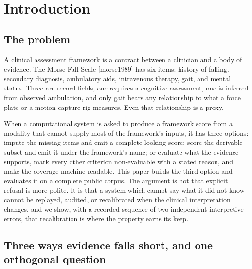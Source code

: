 \documentclass[11pt]{article}
\begin{document}
\begin{abstract}
evidence machinery, had Morse's category names baked in. The contribution is a methods artifact and a replayable record of a clinical interpretation being wrong, localized, corrected without tuning, wrong again for an independent reason, corrected again, and meeting a prespecified boundary of its own generality. Nothing here claims predictive validity or clinical use.
\end{abstract}

\section{Introduction}\label{introduction}

\subsection{The problem}\label{the-problem}

A clinical assessment framework is a contract between a clinician and a body of evidence. The Morse Fall Scale [morse1989] has six items: history of falling, secondary diagnosis, ambulatory aids, intravenous therapy, gait, and mental status. Three are record fields, one requires a cognitive assessment, one is inferred from observed ambulation, and only gait bears any relationship to what a force plate or a motion-capture rig measures. Even that relationship is a proxy.

When a computational system is asked to produce a framework score from a modality that cannot supply most of the framework's inputs, it has three options: impute the missing items and emit a complete-looking score; score the derivable subset and emit it under the framework's name; or evaluate what the evidence supports, mark every other criterion non-evaluable with a stated reason, and make the coverage machine-readable. This paper builds the third option and evaluates it on a complete public corpus. The argument is not that explicit refusal is more polite. It is that a system which cannot say what it did not know cannot be replayed, audited, or recalibrated when the clinical interpretation changes, and we show, with a recorded sequence of two independent interpretive errors, that recalibration is where the property earns its keep.

\subsection{Three ways evidence falls short, and one orthogonal question}\label{three-ways-evidence-falls-short-and-one-orthogonal-question}
\end{document}
